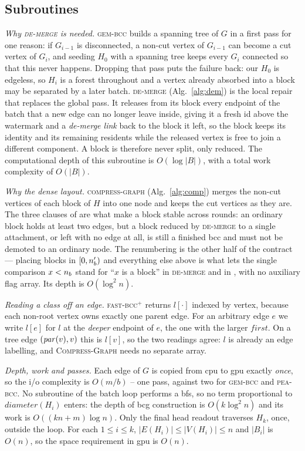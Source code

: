 \subsection{Subroutines}

\noindent
\emph{Why \textsc{de-merge} is needed.} \textsc{gem-bcc} builds a spanning tree
of $G$ in a first pass for one reason: if $G_{i-1}$ is disconnected, a non-cut
vertex of $G_{i-1}$ can become a cut vertex of $G_i$, and seeding $H_0$ with a
spanning tree keeps every $G_i$ connected so that this never happens. Dropping
that pass puts the failure back: our $H_0$ is edgeless, so $H_i$ is a forest
throughout and a vertex already absorbed into a block may be separated by a
later batch. \textsc{de-merge} (Alg.~\ref{alg:dem}) is the local repair that
replaces the global pass. It releases from its block every endpoint of the
batch that a new edge can no longer leave inside, giving it a fresh id above
the watermark and a \emph{de-merge link} back to the block it left, so the
block keeps its identity and its remaining residents while the released vertex
is free to join a different component. A block is therefore never split, only
reduced. The computational depth of this subroutine is $O(\log|B|)$, with a
total work complexity of $O(|B|)$.

\medskip\noindent
\emph{Why the dense layout.} \textsc{compress-graph} (Alg.~\ref{alg:comp})
merges the non-cut vertices of each block of $H$ into one node and keeps the
cut vertices as they are. The three clauses of \FBlk{} are what make a block
stable across rounds: an ordinary block holds at least two edges, but a block
reduced by \textsc{de-merge} to a single attachment, or left with no edge at
all, is still a finished bcc and must not be demoted to an ordinary node. The
renumbering is the other half of the contract --- placing blocks in
$[0,n_b')$ and everything else above is what lets the single comparison
$x < n_b$ stand for ``$x$ is a block'' in \textsc{de-merge} and in
\FPlain{}, with no auxiliary flag array. Its depth is $O(\log^2 n)$.

\medskip\noindent
\emph{Reading a class off an edge.} \textsc{fast-bcc}$^{+}$ returns $l[\cdot]$
indexed by vertex, because each non-root vertex owns exactly one parent edge.
For an arbitrary edge $e$ we write $l[e]$ for $l$ at the \emph{deeper} endpoint
of $e$, the one with the larger $\mathit{first}$. On a tree edge
$(\mathit{par}(v),v)$ this is $l[v]$, so the two readings agree: $l$ is already an
edge labelling, and \textsc{Compress-Graph} needs no separate array.

\medskip\noindent
\emph{Depth, work and passes.} Each edge of $G$ is copied from cpu to gpu
exactly \emph{once}, so the i/o complexity is $O(m/b)$ -- one pass, against
two for \textsc{gem-bcc} and \textsc{pea-bcc}. No subroutine of the batch loop performs a
bfs, so no term proportional to $\mathit{diameter}(H_i)$ enters: the depth of
bcg construction is $O(k\log^2 n)$ and its work is $O((kn+m)\log n)$. Only the
final head readout traverses $H_k$, once, outside the loop. For each $1 \le i \le
k$, $|E(H_i)| \le |V(H_i)| \le n$ and $|B_i|$ is $O(n)$, so the space
requirement in gpu is $O(n)$.
